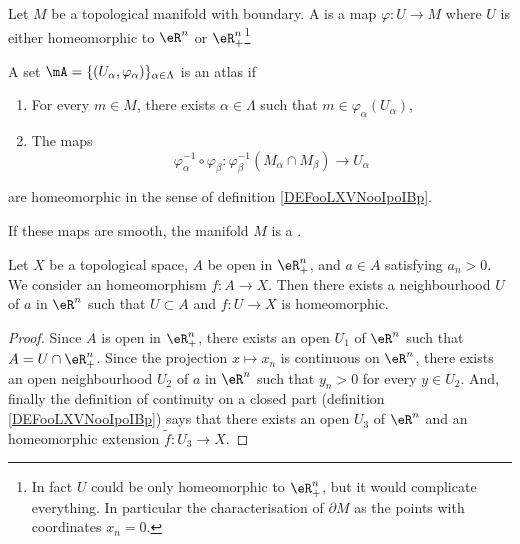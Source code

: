 \begin{theorem}	\label{THOooKKBLooIrITBe}
	Let \( M\) be a topological manifold with boundary. A  is a map \(\varphi \colon U\to M  \) where \( U\) is either homeomorphic to \( \eR^n\) or \( \eR^n_+\)\footnote{In fact \( U\) could be only homeomorphic to \( \eR^n_+\), but it would complicate everything. In particular the characterisation of \( \partial M\) as the points with coordinates \( x_n=0\).}

	A set \( \mA=\{ (U_{\alpha},\varphi_{\alpha}) \}_{\alpha\in \Lambda}\) is an atlas if
	\begin{enumerate}
		\item
		      For every \( m\in M\), there exists \( \alpha\in \Lambda\) such that \( m\in \varphi_{\alpha}(U_{\alpha})\),
		\item
		      The maps
		      \begin{equation}
			      \varphi_{\alpha}^{-1}\circ\varphi_{\beta} \colon \varphi_{\beta}^{-1}(M_{\alpha}\cap M_{\beta})\to U_{\alpha}
		      \end{equation}
	\end{enumerate}
	are homeomorphic in the sense of definition \ref{DEFooLXVNooIpoIBp}.

	If these maps are smooth, the manifold \( M\) is a .
\end{theorem}

\begin{lemma}	\label{LEMooWZOBooGrvNGQ}
	Let \( X\) be a topological space, \( A\) be open in \( \eR^n_+\), and \( a\in A\) satisfying \( a_n>0\). We consider an homeomorphism \(f \colon A\to X  \). Then there exists a neighbourhood \( U\) of \( a\) in \( \eR^n\) such that \( U\subset A\) and \(f \colon U\to X  \) is homeomorphic.
\end{lemma}

\begin{proof}
	Since \( A\) is open in \( \eR^n_+\), there exists an open \( U_1\) of \( \eR^n\) such that \( A=U\cap \eR^n_+\). Since the projection \( x\mapsto x_n\) is continuous on \( \eR^n\), there exists an open neighbourhood \( U_2\) of \( a\) in \( \eR^n\) such that \( y_n>0\) for every \( y\in U_2\). And, finally the definition of continuity on a closed part (definition \ref{DEFooLXVNooIpoIBp}) says that there exists an open \( U_3 \) of \( \eR^n\) and an homeomorphic extension \(\tilde f \colon U_3\to X  \).
\end{proof}

